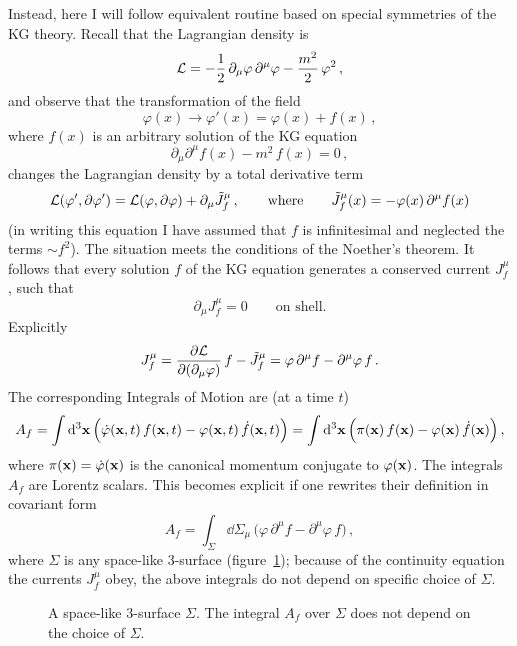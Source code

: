Instead, here I will follow equivalent routine based on special symmetries of
the KG theory. Recall that the Lagrangian density is
\[
\mathcal{L}=-\frac12\,\partial_\mu\varphi\,\partial^\mu\varphi-\frac{m^2}{2}\,\varphi^2\,,
\]
and observe that the transformation of the field
\[
\varphi(x)\to\varphi'(x)=\varphi(x)+f(x)\,,
\]
where $f(x)$ is an arbitrary solution of the KG equation
\[
\partial_\mu\partial^\mu f(x)-m^2\,f(x)=0\,,
\]
changes the Lagrangian density by a total derivative term
\[
\mathcal{L}(\varphi',\partial\varphi')=\mathcal{L}(\varphi,\partial\varphi)+\partial_\mu\tilde J^\mu_f\,,
\qquad\text{where}\qquad
\tilde J^\mu_f(x)=-\varphi(x)\,\partial^\mu f(x)
\]
(in writing this equation I have assumed that $f$ is infinitesimal and
neglected the terms $\sim f^2$). The situation meets the conditions of the
Noether's theorem. It follows that every solution $f$ of the KG equation
generates a conserved current $J^\mu_f$, such that
\[
\partial_\mu J^\mu_f=0\qquad\text{on shell.}
\]
Explicitly
\[
J^\mu_f=\frac{\partial\mathcal{L}}{\partial(\partial_\mu\varphi)}\,f-\tilde J^\mu_f=\varphi\,\partial^\mu f-\partial^\mu\varphi\,f\,.
\]
The corresponding Integrals of Motion are (at a time $t$)
\[
A_f=\int \mathop{}\!\mathrm{d}^3\mathbf{x}\,\Bigl(\dot\varphi(\mathbf{x},t)\,f(\mathbf{x},t)-\varphi(\mathbf{x},t)\,\dot f(\mathbf{x},t)\Bigr)
=\int \mathop{}\!\mathrm{d}^3\mathbf{x}\,\Bigl(\pi(\mathbf{x})\,f(\mathbf{x})-\varphi(\mathbf{x})\,\dot f(\mathbf{x})\Bigr)\,,
\]
where $\pi(\mathbf{x})=\dot\varphi(\mathbf{x})$ is the canonical momentum conjugate to
$\varphi(\mathbf{x})$. The integrals $A_f$ are Lorentz scalars. This becomes explicit
if one rewrites their definition in covariant form
\[
A_f=\int_\Sigma \dd\Sigma_\mu\,\bigl(\varphi\,\partial^\mu f-\partial^\mu\varphi\,f\bigr)\,,
\]
where $\Sigma$ is any space-like 3-surface (figure~\ref{fig:spacelike});
because of the continuity equation the currents $J^\mu_f$ obey, the above
integrals do not depend on specific choice of $\Sigma$.
\begin{figure}[ht]
\centering{}
\caption{A space-like 3-surface $\Sigma$. The integral $A_f$ over $\Sigma$
does not depend on the choice of $\Sigma$.}
\label{fig:spacelike}
\end{figure}

